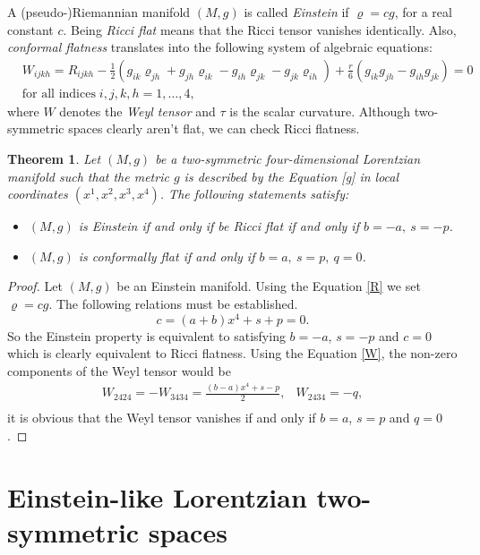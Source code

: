\documentclass[11pt,oneside,leqno]{amsart}
\theoremstyle{plain}
\newtheorem{theorem}{Theorem}[section]
\begin{document}
A (pseudo-)Riemannian manifold $(M,g)$ is called {\em Einstein} if $\varrho=cg$, for a real constant $c$. Being {\em Ricci flat} means that the Ricci tensor vanishes identically. Also, {\em conformal flatness} translates into the following system of algebraic equations:
\begin{eqnarray}\label{W}
&W_{ijkh} = R_{ijkh}-\frac{1}{2}(g_{ik}\varrho_{jh}+g_{jh}\varrho_{ik}-g_{ih}\varrho_{jk}-g_{jk}\varrho_{ih})
+\frac{r}{6}(g_{ik}g_{jh}-g_{ih}g_{jk})=0 \label{cflat}\\[6 pt]
&\text{for all indices} \; i,j,k,h=1,\dots,4, \hspace{210pt} \nonumber
\end{eqnarray}
where $W$ denotes the {\em Weyl tensor} and $\tau$ is the scalar curvature. Although two-symmetric spaces clearly aren't flat,  we can check Ricci flatness.
\vspace{.3cm}
\begin{theorem}
Let $(M,g)$ be a two-symmetric four-dimensional Lorentzian manifold such that the metric $g$ is described by the Equation \eqref{g} in local coordinates $(x^1,x^2,x^3,x^4)$. The following statements satisfy:
\begin{itemize}
\item[a)] $(M,g)$ is Einstein if and only if be Ricci flat if and only if $b=-a,\ s=-p$.
\item[b)] $(M,g)$ is conformally flat if and only if $b=a,\ s=p,\ q=0$.
\end{itemize}
\end{theorem}
\begin{proof}
Let $(M,g)$ be an Einstein manifold. Using  the Equation \eqref{R} we set $\varrho=cg$. The following relations must be  established.
$$
c=(a+b)x^4+s+p=0.
$$
So the Einstein property is equivalent to satisfying $b=-a$, $s=-p$ and $c=0$ which is clearly equivalent to Ricci flatness. Using the Equation \eqref{W}, the non-zero components of the Weyl tensor would be
$$
\begin{array}{ll}
W_{2424}=-W_{3434}=\frac{(b-a)x^4+s-p}{2},& W_{2434}=-q,\\
\end{array}
$$
it is obvious that the Weyl tensor vanishes if and only if $b=a$, $s=p$ and $q=0$.
\end{proof}

\section{Einstein-like Lorentzian two-symmetric spaces}
\end{document}
